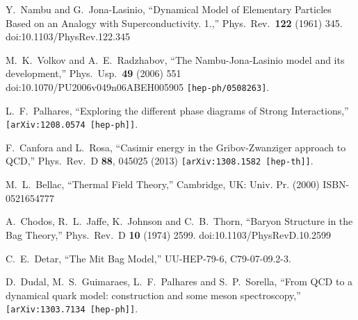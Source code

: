 \documentclass[a4paper,11pt,british,twosides]{book}%
\numberwithin{equation}{section}
\begin{document}
\begin{thebibliography}{9}
  Y.~Nambu and G.~Jona-Lasinio,
  ``Dynamical Model of Elementary Particles Based on an Analogy with Superconductivity. 1.,''
  Phys.\ Rev.\  {\bf 122} (1961) 345.
  doi:10.1103/PhysRev.122.345


  M.~K.~Volkov and A.~E.~Radzhabov,
  ``The Nambu-Jona-Lasinio model and its development,''
  Phys.\ Usp.\  {\bf 49} (2006) 551
  doi:10.1070/PU2006v049n06ABEH005905
  {\tt[hep-ph/0508263]}.


  L.~F.~Palhares,
  ``Exploring the different phase diagrams of Strong Interactions,''
  {\tt [arXiv:1208.0574 [hep-ph]]}.

  F.~Canfora and L.~Rosa,
  ``Casimir energy in the Gribov-Zwanziger approach to QCD,''
  Phys.\ Rev.\ D {\bf 88}, 045025 (2013)
  {\tt[arXiv:1308.1582 [hep-th]]}.


  M.~L.~Bellac,
  ``Thermal Field Theory,''
  Cambridge, UK: Univ. Pr. (2000)
  ISBN-0521654777


  A.~Chodos, R.~L.~Jaffe, K.~Johnson and C.~B.~Thorn,
  ``Baryon Structure in the Bag Theory,''
  Phys.\ Rev.\ D {\bf 10} (1974) 2599.
  doi:10.1103/PhysRevD.10.2599



  C.~E.~Detar,
  ``The Mit Bag Model,''
  UU-HEP-79-6, C79-07-09.2-3.

  D.~Dudal, M.~S.~Guimaraes, L.~F.~Palhares and S.~P.~Sorella,
  ``From QCD to a dynamical quark model: construction and some meson spectroscopy,''
  {\tt [arXiv:1303.7134 [hep-ph]]}.


\end{thebibliography}
\end{document}
